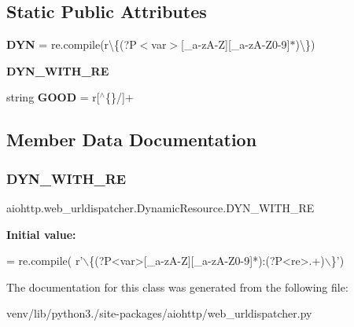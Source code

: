 \subsection*{Static Public Attributes}
\begin{DoxyCompactItemize}
\item 
\mbox{\label{classaiohttp_1_1web__urldispatcher_1_1_dynamic_resource_aff8b1adc25d5b1fe790a55b7b57f9d13}} 
{\bfseries D\+YN} = re.\+compile(r\textquotesingle{}\textbackslash{}\{(?P$<$var$>$\mbox{[}\+\_\+a-\/zA-\/Z\mbox{]}\mbox{[}\+\_\+a-\/zA-\/Z0-\/9\mbox{]}$\ast$)\textbackslash{}\}\textquotesingle{})
\item 
{\bfseries D\+Y\+N\+\_\+\+W\+I\+T\+H\+\_\+\+RE}
\item 
\mbox{\label{classaiohttp_1_1web__urldispatcher_1_1_dynamic_resource_a536b2ca6778446413cf13d302cb77813}} 
string {\bfseries G\+O\+OD} = r\textquotesingle{}\mbox{[}$^\wedge$\{\}/\mbox{]}+\textquotesingle{}
\end{DoxyCompactItemize}


\subsection{Member Data Documentation}
\mbox{\label{classaiohttp_1_1web__urldispatcher_1_1_dynamic_resource_ad6aa3f663aab845ce8755c7f3c69c293}} 
\subsubsection{\texorpdfstring{D\+Y\+N\+\_\+\+W\+I\+T\+H\+\_\+\+RE}{DYN\_WITH\_RE}}
{\footnotesize\ttfamily aiohttp.\+web\+\_\+urldispatcher.\+Dynamic\+Resource.\+D\+Y\+N\+\_\+\+W\+I\+T\+H\+\_\+\+RE\hspace{0.3cm}{\ttfamily [static]}}

{\bfseries Initial value\+:}
\begin{DoxyCode}
=  re.compile(
        \textcolor{stringliteral}{r'\(\backslash\)\{(?P<var>[\_a-zA-Z][\_a-zA-Z0-9]*):(?P<re>.+)\(\backslash\)\}'})
\end{DoxyCode}


The documentation for this class was generated from the following file\+:\begin{DoxyCompactItemize}
\item 
venv/lib/python3./site-\/packages/aiohttp/web\+\_\+urldispatcher.\+py\end{DoxyCompactItemize}
